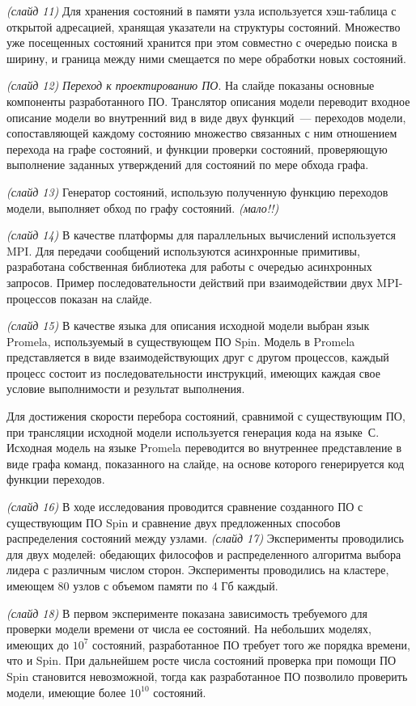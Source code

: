 \documentclass[a4paper,12pt,notitlepage]{article}
\begin{document}
\emph{(слайд 11)} Для хранения состояний в памяти узла используется хэш-таблица с открытой
адресацией, хранящая указатели на структуры состояний. Множество уже посещенных состояний
хранится при этом совместно с очередью поиска в ширину, и граница между ними смещается по
мере обработки новых состояний.

\emph{(слайд 12)} \emph{Переход к проектированию ПО}. На слайде показаны основные
компоненты разработанного ПО. Транслятор описания модели переводит входное описание модели
во внутренний вид в виде двух функций~--- переходов модели, сопоставляющей каждому
состоянию множество связанных с ним отношением перехода на графе состояний, и функции
проверки состояний, проверяющую выполнение заданных утверждений для состояний по мере
обхода графа.

\emph{(слайд 13)} Генератор состояний, использую полученную функцию переходов модели,
выполняет обход по графу состояний. \emph{(мало!!)}

\emph{(слайд 14)} В качестве платформы для параллельных вычислений используется MPI. Для
передачи сообщений используются асинхронные примитивы, разработана собственная библиотека
для работы с очередью асинхронных запросов. Пример последовательности действий при
взаимодействии двух MPI-процессов показан на слайде.

\emph{(слайд 15)} В качестве языка для описания исходной модели выбран язык Promela,
используемый в существующем ПО Spin. Модель в Promela представляется в виде
взаимодействующих друг с другом процессов, каждый процесс состоит из последовательности
инструкций, имеющих каждая свое условие выполнимости и результат выполнения. 

Для достижения скорости перебора состояний, сравнимой с существующим ПО, при трансляции
исходной модели используется генерация кода на языке~С. Исходная модель на языке Promela
переводится во внутреннее представление в виде графа команд, показанного на слайде, на
основе которого генерируется код функции переходов.

\emph{(слайд 16)} В ходе исследования проводится сравнение созданного ПО с существующим ПО
Spin и сравнение двух предложенных способов распределения состояний между
узлами. \emph{(слайд 17)} Эксперименты проводились для двух моделей: обедающих философов и
распределенного алгоритма выбора лидера с различным числом сторон. Эксперименты
проводились на кластере, имеющем 80 узлов с объемом памяти по 4 Гб каждый.

\emph{(слайд 18)} В первом эксперименте показана зависимость требуемого для проверки
модели времени от числа ее состояний. На небольших моделях, имеющих до $10^7$ состояний,
разработанное ПО требует того же порядка времени, что и Spin. При дальнейшем росте числа
состояний проверка при помощи ПО Spin становится невозможной, тогда как разработанное ПО
позволило проверить модели, имеющие более $10^{10}$ состояний.
\end{document}
